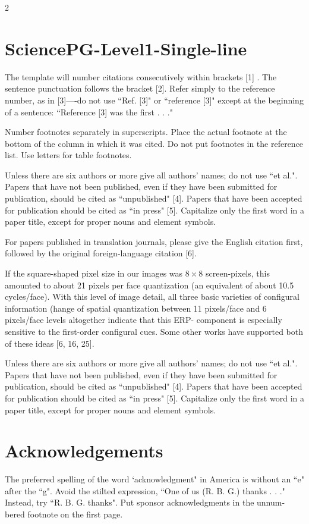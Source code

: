 \documentclass{book}
\theoremstyle{remark}
\begin{document}
\begin{multicols}{2}
\section{SciencePG-Level1-Single-line}
The template will number citations consecutively within brackets [1] . The sentence punctuation follows the bracket [2]. Refer simply to the reference number, as in [3]----do not use ``Ref. [3]" or ``reference [3]" except at the beginning of a sentence: ``Reference [3] was the first . . ."

Number footnotes separately in superscripts. Place the actual footnote at the bottom of the column in which it was cited. Do not put footnotes in the reference list. Use letters for table footnotes.

Unless there are six authors or more give all authors' names; do not use ``et al.". Papers that have not been published, even if they have been submitted for publication, should be cited as ``unpublished" [4]. Papers that have been accepted for publication should be cited as ``in press" [5]. Capitalize only the first word in a paper title, except for proper nouns and element symbols.

For papers published in translation journals, please give the English citation first, followed by the original foreign-language citation [6].

If the square-shaped pixel size in our images was $8 \times 8$ screen-pixels, this amounted to about 21 pixels per face quantization (an equivalent of about 10.5 cycles/face). With this level of image detail, all three basic varieties of configural information (hange of spatial quantization between 11 pixels/face and 6 pixels/face levels altogether indicate that this ERP- component is especially sensitive to the first-order configural cues. Some other works have supported both of these ideas [6, 16, 25].

Unless there are six authors or more give all authors' names; do not use ``et al.". Papers that have not been published, even if they have been submitted for publication, should be cited as ``unpublished" [4]. Papers that have been accepted for publication should be cited as ``in press" [5]. Capitalize only the first word in a paper title, except for proper nouns and element symbols.

\section*{Acknowledgements}
The preferred spelling of the word `acknowledgment" in America is without an ``e" after the ``g". Avoid the stilted expression, ``One of us (R. B. G.) thanks . . ." Instead, try ``R. B. G. thanks". Put sponsor acknowledgments in the unnum-bered footnote on the first page.


\end{multicols}
\end{document}
